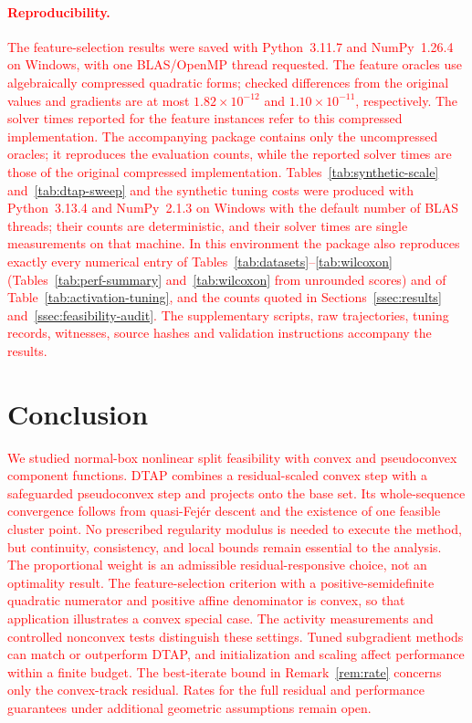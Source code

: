 \documentclass[]{interact}
\theoremstyle{plain}
\theoremstyle{definition}
\theoremstyle{remark}
\begin{document}
\paragraph*{\textcolor{red}{Reproducibility.}}
\leavevmode\textcolor{red}{The feature-selection results were saved with Python~3.11.7 and NumPy~1.26.4
on Windows, with one BLAS/OpenMP thread requested. The feature oracles use algebraically
compressed quadratic forms; checked differences from the original
values and gradients are at most $1.82\times10^{-12}$ and
$1.10\times10^{-11}$, respectively. The solver times reported for the feature instances refer
to this compressed implementation. The accompanying package contains only the uncompressed
oracles; it reproduces the evaluation counts, while the reported solver times are those of
the original compressed implementation. Tables~\ref{tab:synthetic-scale}
and~\ref{tab:dtap-sweep} and the synthetic tuning costs were produced with
Python~3.13.4 and NumPy~2.1.3 on Windows with the default number of BLAS
threads; their counts are deterministic, and their solver times are single
measurements on that machine. In this environment the package also
reproduces exactly every numerical entry of Tables~\ref{tab:datasets}--\ref{tab:wilcoxon}
(Tables~\ref{tab:perf-summary} and~\ref{tab:wilcoxon} from unrounded scores) and of
Table~\ref{tab:activation-tuning}, and the counts quoted in Sections~\ref{ssec:results}
and~\ref{ssec:feasibility-audit}.
The supplementary scripts, raw trajectories, tuning records, witnesses,
source hashes and validation instructions accompany the results.}

\section{Conclusion}\label{sec:conclusion}
\leavevmode\textcolor{red}{We studied normal-box nonlinear split feasibility with convex and pseudoconvex component functions. DTAP combines a residual-scaled convex step with a safeguarded pseudoconvex step and projects onto the base set. Its whole-sequence convergence follows from quasi-Fej\'er descent and the existence of one feasible cluster point. No prescribed regularity modulus is needed to execute the method, but continuity, consistency, and local bounds remain essential to the analysis. The proportional weight is an admissible residual-responsive choice, not an optimality result. The feature-selection criterion with a positive-semidefinite quadratic numerator and positive affine denominator is convex, so that application illustrates a convex special case. The activity measurements and controlled nonconvex tests distinguish these settings. Tuned subgradient methods can match or outperform DTAP, and initialization and scaling affect performance within a finite budget. The best-iterate bound in Remark~\ref{rem:rate} concerns only the convex-track residual. Rates for the full residual and performance guarantees under additional geometric assumptions remain open.}
\end{document}
